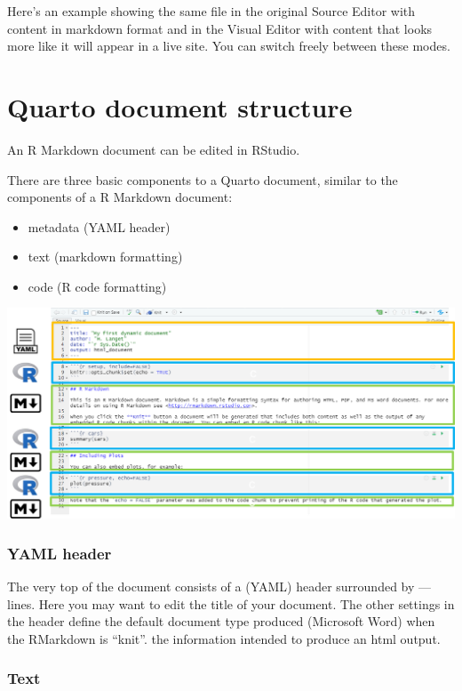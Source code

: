 \documentclass[
  letterpaper,
  DIV=11,
  numbers=noendperiod]{scrreprt}
\providecommand{\tightlist}{%
  \setlength{\itemsep}{0pt}\setlength{\parskip}{0pt}}\usepackage{longtable,booktabs,array}
\begin{document}
Here's an example showing the same file in the original Source Editor
with content in markdown format and in the Visual Editor with content
that looks more like it will appear in a live site. You can switch
freely between these modes.

\hypertarget{quarto-document-structure}{%
\section{Quarto document structure}\label{quarto-document-structure}}

An R Markdown document can be edited in RStudio.

There are three basic components to a Quarto document, similar to the
components of a R Markdown document:

\begin{itemize}
\tightlist
\item
  metadata (YAML header)
\item
  text (markdown formatting)
\item
  code (R code formatting)
\end{itemize}

\includegraphics{./images/paste-30C30ECC.png}

\hypertarget{yaml-header}{%
\subsubsection{YAML header}\label{yaml-header}}

The very top of the document consists of a (YAML) header surrounded by
--- lines. Here you may want to edit the title of your document. The
other settings in the header define the default document type produced
(Microsoft Word) when the RMarkdown is ``knit''. the information
intended to produce an html output.

\hypertarget{text}{%
\subsubsection{Text}\label{text}}
\end{document}
